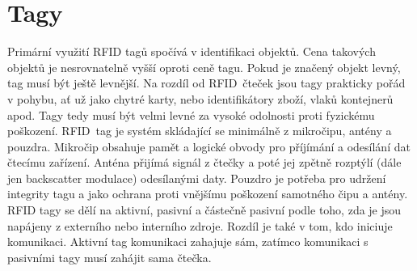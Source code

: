 \section{Tagy}
Primární využití RFID tagů spočívá v identifikaci objektů. Cena takových objektů je nesrovnatelně vyšší oproti ceně tagu. Pokud je značený objekt levný, tag musí být ještě levnější. Na rozdíl od RFID~čteček jsou tagy prakticky pořád v pohybu, ať už jako chytré karty, nebo identifikátory zboží, vlaků kontejnerů apod. Tagy tedy musí být velmi levné za vysoké odolnosti proti fyzickému poškození\cite{The_RF_in_RFID}.
RFID~tag je systém skládající se minimálně z mikročipu, antény a pouzdra. Mikročip obsahuje pamět a logické obvody pro příjímání a odesílání dat čtecímu zařízení. Anténa přijímá signál z čtečky a poté jej zpětně rozptýlí (dále jen backscatter modulace) odesílanými daty. Pouzdro je potřeba pro udržení integrity tagu a jako ochrana proti vnějšímu poškození samotného čipu a antény\cite{RFID_explained}.
RFID tagy se dělí na aktivní, pasivní a částečně pasivní podle toho, zda je jsou napájeny z externího nebo interního zdroje\cite{The_RF_in_RFID}. Rozdíl je také v tom, kdo iniciuje komunikaci. Aktivní tag komunikaci zahajuje sám, zatímco komunikaci s pasivními tagy musí zahájit sama čtečka\cite{Hazardous_areas}. 

